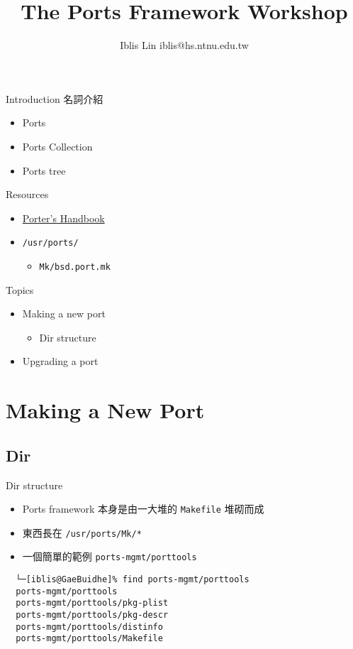 \documentclass[aspectratio=169]{beamer}
\title{The Ports Framework Workshop}
\author{Iblis Lin \textlangle{}iblis@hs.ntnu.edu.tw\textrangle{}}
\begin{document}
\begin{frame}
  \titlepage
\end{frame}

\begin{frame}[t]{Introduction}
  名詞介紹
  \begin{itemize}
    \item Ports
    \item Ports Collection
    \item Ports tree
  \end{itemize}
\end{frame}

\begin{frame}[t,fragile]{Resources}
  \begin{itemize}
    \item \href{https://www.freebsd.org/doc/en_US.ISO8859-1/books/porters-handbook/book.html}{Porter's Handbook}
    \item \verb|/usr/ports/|
      \begin{itemize}
        \item \verb|Mk/bsd.port.mk|
      \end{itemize}
  \end{itemize}
\end{frame}

\begin{frame}[t,fragile]{Topics}
  \begin{itemize}
    \item Making a new port
      \begin{itemize}
        \item Dir structure
      \end{itemize}
    \item Upgrading a port
  \end{itemize}
\end{frame}

\section{Making a New Port}
\subsection{Dir}
\begin{frame}[t,fragile]{Dir structure}
  \begin{itemize}
    \item Ports framework 本身是由一大堆的 \verb|Makefile| 堆砌而成
    \item 東西長在 \verb|/usr/ports/Mk/*|
    \item 一個簡單的範例 \verb|ports-mgmt/porttools|
  \end{itemize}

  \begin{verbatim}
  └─[iblis@GaeBuidhe]% find ports-mgmt/porttools
  ports-mgmt/porttools
  ports-mgmt/porttools/pkg-plist
  ports-mgmt/porttools/pkg-descr
  ports-mgmt/porttools/distinfo
  ports-mgmt/porttools/Makefile
  \end{verbatim}
\end{frame}
\end{document}
